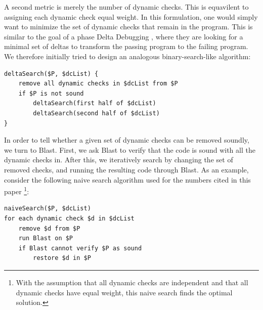 \documentclass[10pt,letterpaper,twocolumn,english]{article}
\begin{document}
A second metric is merely the number of dynamic checks.  This is
equavilent to assigning each dynamic check equal weight.  In this
formulation, one would simply want to minimize the set of dynamic checks
that remain in the program.  This is similar to the goal of a phase
Delta Debugging \cite{deltaDebugging}, where they are looking for a
minimal set of deltas to transform the passing program to the failing
program.  We therefore initially tried to design an analogous
binary-search-like algorithm:

\begin{verbatim}
deltaSearch($P, $dcList) {
	remove all dynamic checks in $dcList from $P
	if $P is not sound
		deltaSearch(first half of $dcList)
		deltaSearch(second half of $dcList)
}
\end{verbatim}

 


In order to tell whether a given set of dynamic checks can be removed
soundly, we turn to Blast.  First, we ask Blast to verify that the code
is sound with all the dynamic checks in.  After this, we iteratively
search by changing the set of removed checks, and running the resulting
code through Blast.  As an example, consider the following naive search
algorithm used for the numbers cited in this paper \footnote{With the
assumption that all dynamic checks are independent and that all dynamic
checks have equal weight, this naive search finds the optimal
solution.}:

\begin{verbatim}
naiveSearch($P, $dcList)
for each dynamic check $d in $dcList
    remove $d from $P
    run Blast on $P
    if Blast cannot verify $P as sound
        restore $d in $P
\end{verbatim}
\end{document}
